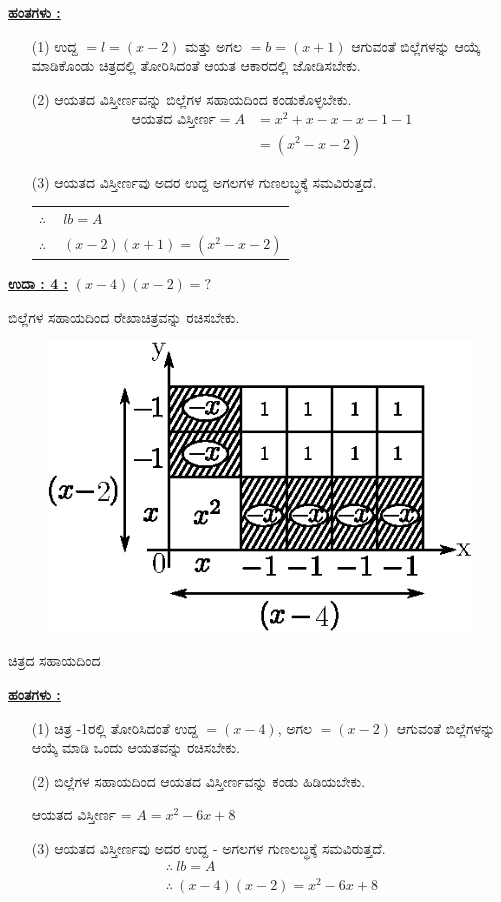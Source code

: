 \noindent
{\textbf{\underline{ಹಂತಗಳು :}}}
\begin{itemize}
\item [(1)] ಉದ್ದ $= l = (x - 2)$ ಮತ್ತು ಅಗಲ $= b = (x + 1)$ ಆಗುವಂತೆ ಬಿಲ್ಲೆಗಳನ್ನು ಆಯ್ಕೆ ಮಾಡಿಕೊಂಡು ಚಿತ್ರದಲ್ಲಿ ತೋರಿಸಿದಂತೆ ಆಯತ ಆಕಾರದಲ್ಲಿ ಜೋಡಿಸ\break ಬೇಕು. 
\item [(2)] ಆಯತದ ವಿಸ್ತೀರ್ಣವನ್ನು ಬಿಲ್ಲೆಗಳ ಸಹಾಯದಿಂದ ಕಂಡುಕೊಳ್ಳಬೇಕು. 
\begin{align*}
\text{ಆಯತದ ವಿಸ್ತೀರ್ಣ}= A & = x^2 + x - x - x - 1 - 1\\
& = (x^2 - x - 2)
\end{align*}
\item [(3)] ಆಯತದ ವಿಸ್ತೀರ್ಣವು ಅದರ ಉದ್ದ ಅಗಲಗಳ ಗುಣಲಬ್ಧಕ್ಕೆ ಸಮವಿರುತ್ತದೆ.
\begin{tabular}{ll}
$\therefore~$ & $lb = A$\\
$\therefore~$ & $(x-2)(x+1) = (x^2-x-2)$
\end{tabular}

\end{itemize}

\medskip
\noindent
{\textbf{\underline{ಉದಾ : 4 :}}} $(x-4)(x-2) = ?$

ಬಿಲ್ಲೆಗಳ ಸಹಾಯದಿಂದ ರೇಖಾಚಿತ್ರವನ್ನು ರಚಿಸಬೇಕು.
\begin{figure}[H]
\centering
\includegraphics[scale=0.8]{src/figure/chap3/fig3-31d.eps}
\end{figure}
ಚಿತ್ರದ ಸಹಾಯದಿಂದ

\noindent
{\textbf{\underline{ಹಂತಗಳು :}}}
\begin{itemize}
\item [(1)] ಚಿತ್ರ -1ರಲ್ಲಿ ತೋರಿಸಿದಂತೆ ಉದ್ದ $= (x-4)$, ಅಗಲ $= (x-2)$ ಆಗುವಂತೆ ಬಿಲ್ಲೆಗಳನ್ನು  ಆಯ್ಕೆ ಮಾಡಿ ಒಂದು ಆಯತವನ್ನು ರಚಿಸಬೇಕು. 
\item [(2)] ಬಿಲ್ಲೆಗಳ ಸಹಾಯದಿಂದ ಆಯತದ ವಿಸ್ತೀರ್ಣವನ್ನು ಕಂಡು ಹಿಡಿಯಬೇಕು. 

ಆಯತದ ವಿಸ್ತೀರ್ಣ = $A = x^2 - 6x + 8$
\item [(3)] ಆಯತದ ವಿಸ್ತೀರ್ಣವು ಅದರ ಉದ್ದ - ಅಗಲಗಳ ಗುಣಲಬ್ಧಕ್ಕೆ ಸಮವಿರುತ್ತದೆ. 
\begin{gather*}
\therefore~ lb = A\\
\therefore~ (x-4)(x-2) = x^2 - 6x + 8
\end{gather*}
\end{itemize}

